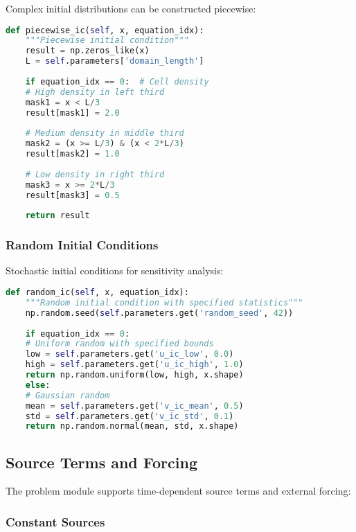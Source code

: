 Complex initial distributions can be constructed piecewise:

\begin{lstlisting}[language=Python, caption=Piecewise Initial Conditions]
	def piecewise_ic(self, x, equation_idx):
	"""Piecewise initial condition"""
	result = np.zeros_like(x)
	L = self.parameters['domain_length']
	
	if equation_idx == 0:  # Cell density
	# High density in left third
	mask1 = x < L/3
	result[mask1] = 2.0
	
	# Medium density in middle third  
	mask2 = (x >= L/3) & (x < 2*L/3)
	result[mask2] = 1.0
	
	# Low density in right third
	mask3 = x >= 2*L/3
	result[mask3] = 0.5
	
	return result
\end{lstlisting}

\subsubsection{Random Initial Conditions}

Stochastic initial conditions for sensitivity analysis:

\begin{lstlisting}[language=Python, caption=Random Initial Conditions]
	def random_ic(self, x, equation_idx):
	"""Random initial condition with specified statistics"""
	np.random.seed(self.parameters.get('random_seed', 42))
	
	if equation_idx == 0:
	# Uniform random with specified bounds
	low = self.parameters.get('u_ic_low', 0.0)
	high = self.parameters.get('u_ic_high', 1.0)
	return np.random.uniform(low, high, x.shape)
	else:
	# Gaussian random
	mean = self.parameters.get('v_ic_mean', 0.5)
	std = self.parameters.get('v_ic_std', 0.1)
	return np.random.normal(mean, std, x.shape)
\end{lstlisting}

\subsection{Source Terms and Forcing}
\label{subsec:source_terms}

The problem module supports time-dependent source terms and external forcing:

\subsubsection{Constant Sources}

